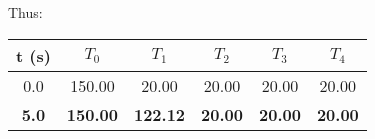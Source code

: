 \documentclass[calculator,datasheet,handbook,solutions]{exam}
\begin{document}
\begin{question}
\begin{enumerate}
{Thus:~
\begin{center}
\begin{tabular}{c | c c c c c }
{\bf t (s)}  &  $T_{0}$  &  $T_{1}$  &  $T_{2}$  &  $T_{3}$  &  $T_{4}$  \\
\hline
0.0          &  150.00  &  20.00    &  20.00   &  20.00   &  20.00  \\
{\bf 5.0 }         &  {\bf 150.00 }  &  {\bf 122.12 }   &  {\bf 20.00 }   &  {\bf 20.00 }   &  {\bf 20.00 }
\end{tabular}
\end{center}
}
      
  \end{enumerate}
\end{question}
 

\pagebreak
%
% 
\paperend
\end{document}
